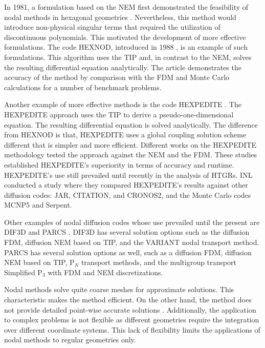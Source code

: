 \documentclass[11pt,letterpaper]{article}
\begin{document}
In 1981, a formulation based on the \gls{NEM} first demonstrated the feasibility of nodal methods in hexagonal geometries \cite{duracz_nodal_1981}.
Nevertheless, this method would introduce non-physical singular terms that required the utilization of discontinuous polynomials.
This motivated the development of more effective formulations.
The code HEXNOD, introduced in 1988 \cite{wagner_three-dimensional_1989}, is an example of such formulations.
This algorithm uses the \gls{TIP} and, in contrast to the \gls{NEM}, solves the resulting differential equation analytically.
The article demonstrates the accuracy of the method by comparison with the \gls{FDM} and Monte Carlo calculations for a number of benchmark problems.

Another example of more effective methods is the code HEXPEDITE \cite{fitzpatrick_hexpedite_1992}.
The HEXPEDITE approach uses the \gls{TIP} to derive a pseudo-one-dimensional equation.
The resulting differential equation is solved analytically.
The difference from HEXNOD is that, HEXPEDITE uses a global coupling solution scheme different that is simpler and more efficient.
Different works \cite{fitzpatrick_hexpedite_1992}\cite{fitzpatrick_developments_1995} on the HEXPEDITE methodology tested the approach against the \gls{NEM} and the \gls{FDM}.
These studies established HEXPEDITE’s superiority in terms of accuracy and runtime.
HEXPEDITE's use still prevailed until recently in the analysis of \glspl{HTGR}.
INL conducted a study \cite{ortensi_deterministic_2010-1} where they compared HEXPEDITE's results against other diffusion codes: JAR, CITATION, and CRONOS2, and the Monte Carlo codes MCNP5 and Serpent.

Other examples of nodal diffusion codes whose use prevailed until the present are DIF3D \cite{lawrence_dif3d_1983} and PARCS \cite{downar_parcs_2004}.
DIF3D has several solution options such as the diffusion \gls{FDM}, diffusion \gls{NEM} based on \gls{TIP}, and the VARIANT nodal transport method.
PARCS has several solution options as well, such as a diffusion \gls{FDM}, diffusion \gls{NEM} based on \gls{TIP}, P$_{N}$ transport methods, and the multigroup transport Simplified P$_3$ with \gls{FDM} and \gls{NEM} discretizations.

Nodal methods solve quite coarse meshes for approximate solutions.
This characteristic makes the method efficient.
On the other hand, the method does not provide detailed point-wise accurate solutions \cite{kang_finite_1973}.
Additionally, the application to complex problems is not flexible as different geometries require the integration over different coordinate systems.
This lack of flexibility limits the applications of nodal methods to regular geometries only.
\end{document}
